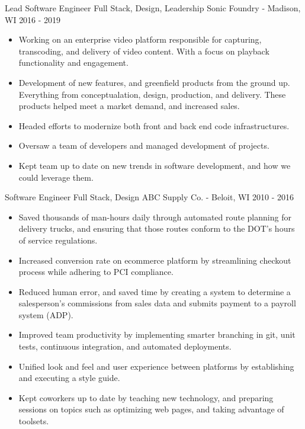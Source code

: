 \documentclass[]{clean-resume}
\begin{document}
\entry
	{Lead Software Engineer}
	{Full Stack, Design, Leadership}
	{Sonic Foundry - Madison, WI}
	{2016 - 2019}
	{
		\begin{itemize}
			\item Working on an enterprise video platform responsible for capturing, transcoding, and delivery of video content. With a focus on playback functionality and engagement.

			\item Development of new features, and greenfield products from the ground up. Everything from conceptualation, design, production, and delivery. These products helped meet a market demand, and increased sales.

			\item Headed efforts to modernize both front and back end code infrastructures.

			\item Oversaw a team of developers and managed development of projects.

			\item Kept team up to date on new trends in software development, and how we could leverage them.
		\end{itemize}
	}

\entry
	{Software Engineer}
	{Full Stack, Design}
	{ABC Supply Co. - Beloit, WI}
	{2010 - 2016}
	{
		\begin{itemize}
			\item Saved thousands of man-hours daily through automated route planning for delivery trucks, and ensuring that those routes conform to the DOT's hours of service regulations.
		
			\item Increased conversion rate on ecommerce platform by streamlining checkout process while adhering to PCI compliance.
			
			\item Reduced human error, and saved time by creating a system to determine a salesperson's commissions from sales data and submits payment to a payroll system (ADP).
		
			\item Improved team productivity by implementing smarter branching in git, unit tests, continuous integration, and automated deployments.
		
			\item Unified look and feel and user experience between platforms by establishing and executing a style guide.
		
			\item Kept coworkers up to date by teaching new technology, and preparing sessions on topics such as optimizing web pages, and taking advantage of toolsets.
		\end{itemize}
		
	}
\end{document}
